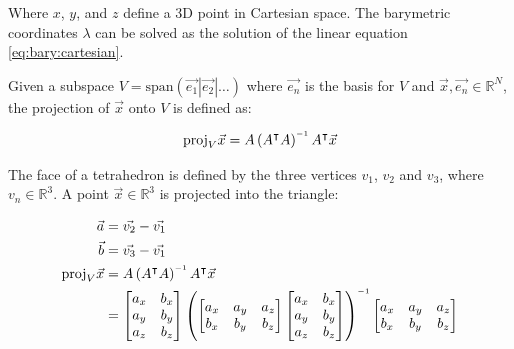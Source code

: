 Where  $x$,  $y$, and $z$ define a 3D point in Cartesian space.  The  barymetric
coordinates  $\lambda$  can  be  solved as the solution of the  linear  equation
\ref{eq:bary:cartesian}.

Given a subspace $V =  \text{span}\left(\vec{e_1}|\vec{e_2}|\ldots\right)$ where
$\vec{e_n}$ is the basis for  $V$  and  $\vec{x},\vec{e_n}\in\mathbb{R}^N$,  the
projection of $\vec{x}$ onto $V$ is defined as:

\begin{align}
    \text{proj}_V\vec{x} = A\left(A^\intercal A\right)\inv A^\intercal\vec{x}
\end{align}

The face of a tetrahedron is defined  by  the  three  vertices  $v_1$, $v_2$ and
$v_3$, where $v_n\in\mathbb{R}^3$. A point $\vec{x}\in\mathbb{R}^3$ is projected
into the triangle:

\begin{align*}
    \vec{a} &= \vec{v_2} - \vec{v_1} \\
    \vec{b} &= \vec{v_3} - \vec{v_1} \\
    \text{proj}_V\vec{x} &= A\left(A^\intercal A\right)\inv A^\intercal\vec{x} \\
                         &= \begin{bmatrix}
                                a_x & b_x \\
                                a_y & b_y \\
                                a_z & b_z \\
                            \end{bmatrix}
                            \left(
                                \begin{bmatrix}
                                    a_x & a_y & a_z \\
                                    b_x & b_y & b_z \\
                                \end{bmatrix}
                                \begin{bmatrix}
                                    a_x & b_x \\
                                    a_y & b_y \\
                                    a_z & b_z \\
                                \end{bmatrix}
                            \right)\inv
                            \begin{bmatrix}
                                a_x & a_y & a_z \\
                                b_x & b_y & b_z \\
                            \end{bmatrix} \\
\end{align*}


